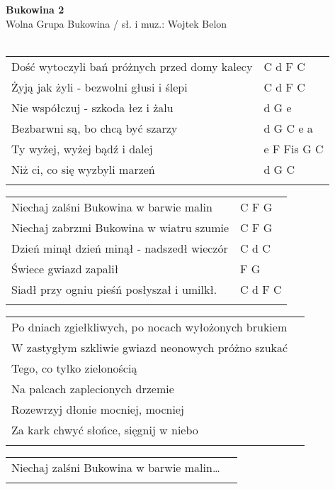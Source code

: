 \documentclass[a5paper]{article}
\begin{document}


\noindent
\fontsize{12pt}{15pt}\selectfont
\textbf{Bukowina 2} \\
\fontsize{8pt}{10pt}\selectfont
Wolna Grupa Bukowina / sł. i muz.: Wojtek Belon  \\ \\
\fontsize{10pt}{12pt}\selectfont
{}
\begin{tabular}{@{}p{8.5cm}p{3cm}@{}}
\noindent
Dość wytoczyli bań próżnych przed domy kalecy & C d F C \\
Żyją jak żyli - bezwolni głusi i ślepi & C d F C \\
Nie współczuj - szkoda łez i żalu & d G e \\
Bezbarwni są, bo chcą być szarzy & d G C e a \\
Ty wyżej, wyżej bądź i dalej & e F Fis G C \\
Niż ci, co się wyzbyli marzeń & d G C \\ \\
\end{tabular}

\noindent
\begin{tabular}{@{}p{7.5cm}p{3cm}@{}}
Niechaj zalśni Bukowina w barwie malin & C F G \\
Niechaj zabrzmi Bukowina w wiatru szumie & C F G \\
Dzień minął dzień minął - nadszedł wieczór & C d C \\
Świece gwiazd zapalił & F G \\
Siadł przy ogniu pieśń posłyszał i umilkł. & C d  F C \\ \\
\end{tabular}

\noindent
\begin{tabular}{@{}p{8.5cm}p{3cm}@{}}
Po dniach zgiełkliwych, po nocach wyłożonych brukiem \\
W zastygłym szkliwie gwiazd neonowych próżno szukać \\
Tego, co tylko zielonością \\
Na palcach zaplecionych drzemie \\
Rozewrzyj dłonie mocniej, mocniej \\
Za kark chwyć słońce, sięgnij w niebo \\ \\
\end{tabular}

\noindent
\begin{tabular}{@{}p{8.5cm}p{3cm}@{}}
Niechaj zalśni Bukowina w barwie malin… \\ \\
\end{tabular}
\end{document}
